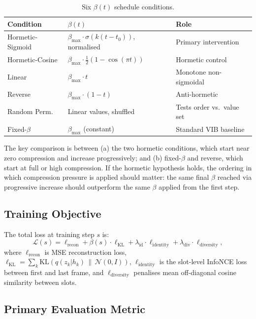 \documentclass{article}
\begin{document}
\begin{table}[h]
  \centering
  \caption{Six $\beta(t)$ schedule conditions.}
  \label{tab:schedules}
  \begin{tabular}{lll}
    \toprule
    Condition & $\beta(t)$ & Role \\
    \midrule
    Hormetic-Sigmoid & $\beta_\text{max} \cdot \sigma(k(t - t_0))$, normalised & Primary intervention \\
    Hormetic-Cosine  & $\beta_\text{max} \cdot \tfrac{1}{2}(1-\cos(\pi t))$ & Hormetic control \\
    Linear           & $\beta_\text{max} \cdot t$ & Monotone non-sigmoidal \\
    Reverse          & $\beta_\text{max} \cdot (1 - t)$ & Anti-hormetic \\
    Random Perm.     & Linear values, shuffled & Tests order vs.\ value set \\
    Fixed-$\beta$    & $\beta_\text{max}$ (constant) & Standard VIB baseline \\
    \bottomrule
  \end{tabular}
\end{table}

The key comparison is between (a) the two hormetic conditions, which start near
zero compression and increase progressively; and (b) fixed-$\beta$ and reverse,
which start at full or high compression.
If the hormetic hypothesis holds, the ordering in which compression pressure is
applied should matter: the same final $\beta$ reached via progressive increase
should outperform the same $\beta$ applied from the first step.

\subsection{Training Objective}

The total loss at training step $s$ is:
\begin{equation}
  \mathcal{L}(s) = \ell_\text{recon} + \beta(s) \cdot \ell_\text{KL}
    + \lambda_\text{id} \cdot \ell_\text{identity}
    + \lambda_\text{div} \cdot \ell_\text{diversity},
\end{equation}
where $\ell_\text{recon}$ is MSE reconstruction loss,
$\ell_\text{KL} = \sum_k \text{KL}(q(z_k|h_k)\,\|\,\mathcal{N}(0,I))$,
$\ell_\text{identity}$ is the slot-level InfoNCE loss between first and last
frame, and $\ell_\text{diversity}$ penalises mean off-diagonal cosine similarity
between slots.

\subsection{Primary Evaluation Metric}
\end{document}
